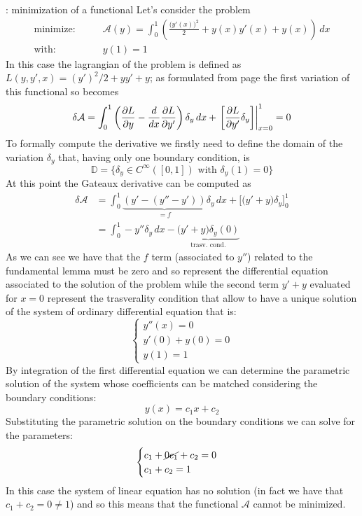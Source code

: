 \begin{example}{: minimization of a functional}
	Let's consider the problem
	\begin{align*}
		\textrm{minimize:}& \qquad \mathcal A(y) = \int_0^1 \left( \frac{\big(y'(x)\big)^2}{2} + y(x)y'(x) + y(x) \right)\, dx \\
		\textrm{with:}& \qquad y(1) = 1
	\end{align*}
	In this case the lagrangian of the problem is defined as $L (y,y',x) = (y')^2/2 + y y' + y$; as formulated from page \pageref{sec:func:eullag} the first variation of this functional so becomes
	\[ \delta \mathcal A = \int_0^1 \left( \frac{\partial L }{\partial y} - \frac{d}{dx} \frac{\partial L }{\partial y'} \right)\delta_y\, dx + \left. \left[ \frac{\partial L }{\partial y'} \delta_y\right] \right|_{x = 0}^1 = 0 \]
	To formally compute the derivative we firstly need to define the domain of the variation $\delta_y$ that, having only one boundary condition, is
	\[ \mathds D = \{ \delta_y \in C^\infty([0,1]) \textrm{ with } \delta_y(1) = 0\} \]
	At this point the Gateaux derivative can be computed as
	\begin{align*}
		\delta \mathcal A & = \int_0^1 \underbrace{\left( y' - (y'' - y') \right) }_{=f} \delta_y \, dx + \Big[ \big(y'+y\big) \delta_y \Big]_0^1 \\
		& = \int_0^1 -y'' \delta_y\, dx - \underbrace{\big(y'+y\big)\delta_y(0)}_\textrm{trasv. cond.}
	\end{align*}
	As we can see we have that the $f$ term (associated to $y''$) related to the fundamental lemma must be zero and so represent the differential equation associated to the solution of the problem while the second term $y'+y$ evaluated for $x = 0$ represent the trasverality condition that allow to have a unique solution of the system of ordinary differential equation that is:
	\[ \begin{cases}
		y''(x) = 0 \\ 
		y'(0) + y(0) = 0 \\
		y(1) = 1
	\end{cases} \]
	By integration of the first differential equation we can determine the parametric solution of the system whose coefficients can be matched considering the boundary conditions:
	\[ y(x) = c_1x + c_2 \]
	Substituting the parametric solution on the boundary conditions we can solve for the parameters:
	\[ \begin{cases}
		c_1 + \cancel{0c_1} + c_2 = 0 \\ c_1+c_2 = 1
	\end{cases} \]
	In this case the system of linear equation has no solution (in fact we have that $c_1 + c_2 = 0 \neq 1$) and so this means that the functional $\mathcal A$ cannot be minimized.
	
\end{example}

